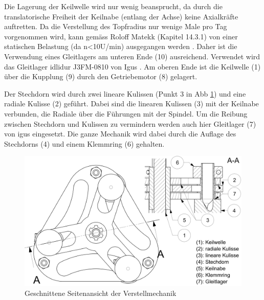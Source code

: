 Die Lagerung der Keilwelle wird nur wenig beansprucht, da durch die translatorische Freiheit der Keilnabe (entlang der Achse) keine Axialkräfte auftretten. Da die Verstellung des Topfradius nur wenige Male pro Tag vorgenommen wird, kann gemäss Roloff Matekk (Kapitel 14.3.1) von einer statischen Belastung (da n<10U/min) ausgegangen werden \cite{roloffmatek}. Daher ist die Verwendung eines Gleitlagers am unteren Ende (10) ausreichend. Verwendet wird das Gleitlager idlidur J3FM-0810 von Igus \cite{igusJ3FM}. Am oberen Ende ist die Keilwelle (1) über die Kupplung (9) durch den Getriebemotor (8) gelagert.
\newline

Der Stechdorn wird durch zwei lineare Kulissen (Punkt 3 in Abb \ref{fig:schnitt_vm}) und eine radiale Kulisse (2) geführt. Dabei sind die linearen Kulissen (3) mit der Keilnabe verbunden, die Radiale über die Führungen mit der Spindel. Um die Reibung zwischen Stechdorn und Kulissen zu vermindern werden auch hier Gleitlager (7) von igus eingesetzt. Die ganze Mechanik wird dabei durch die Auflage des Stechdorns (4) und einem Klemmring (6) gehalten.
	\begin{figure}[H]
	\includegraphics[scale=0.63]{Illustrationen/6-Umsetzung/schnitt_vm.jpg}
	\caption{Geschnittene Seitenansicht der Verstellmechanik}
	\label{fig:schnitt_vm}
	\end{figure}

